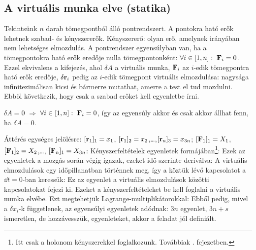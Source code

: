   \subsection{A virtuális munka elve (statika)}
   
   Tekintsünk $n$ darab tömegpontból álló pontrendszert. A pontokra ható erők lehetnek szabad- és kényszererők. Kényszererő: olyan erő, amelynek irányában nem lehetséges elmozdulás. A pontrendszer egyensúlyban van, ha a tömegpontokra ható erők eredője nulla tömegpontonként: $\forall i\in [1,n]:\; \mathbf{F}_i=0$. Ezzel ekvivalens a 
   kifejezés, ahol $\delta A$ a virtuális munka, $\mathbf{F}_i$ az $i$-edik tömegpontra ható erők eredője, $\delta\mathbf{r}_i$ pedig az $i$-edik tömegpont virtuális elmozdulása: nagysága infinitezimálisan kicsi és bármerre mutathat, amerre a test el tud mozdulni. Ebből következik, hogy csak a szabad erőket kell  egyenletbe írni. 
   
   $\delta A=0$ $\Rightarrow$ $\forall i\in [1,n]:\; \mathbf{F}_i=0$, így az egyensúly akkor és csak akkor állhat fenn, ha $\delta A=0$.
   
   Áttérés egységes jelölésre: $[\mathbf{r}_1]_1=x_1$, $[\mathbf{r}_1]_2=x_2$,\dots,$[\mathbf{r}_n]_3=x_{3n}$; $[\mathbf{F}_1]_1=X_1$, $[\mathbf{F}_1]_2=X_2$,\dots, $[\mathbf{F}_n]_1=X_{3n}$:
   Kényszerfeltételek egyenletek formájában\footnote{Itt csak a holonom kényszerekkel foglalkozunk. Továbbiak . fejezetben.}: 
   Ezek az egyenletek a mozgás során végig igazak, ezeket idő szerinte deriválva:
   A virtuális elmozdulások egy időpillanatban történnek meg, így a köztük lévő kapcsolatot a $\dd t=0$-ban keressük:
   Ez az egyenlet a virtuális elmozdulások közötti kapcsolatokat fejezi ki.  Ezeket a kényszerfeltételeket be kell foglalni a virtuális munka elvébe. Ezt megtehetjük Lagrange-multiplikátorokkal: 
   Ebből pedig, mivel a $\delta x_i$-k függetlenek, az egyensúlyi egyenletek adódnak:
   $3n$ egyenlet, $3n+s$ ismeretlen, de hozzávesszük,  egyenleteket, akkor a feladat jól definiált. 
  
